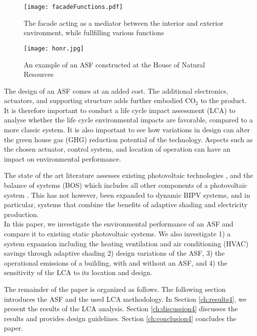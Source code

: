 \begin{figure}
\begin{center}
\texttt{[image: facadeFunctions.pdf]}
\caption{The facade acting as a mediator between the interior and exterior environment, while fullfilling various functions \cite{nagy2016adaptive}}
\label{fig:ASFschematic4}
\end{center}
\end{figure}

\begin{figure}
\begin{center}
\texttt{[image: honr.jpg]}
\caption{An example of an ASF constructed at the House of Natural Resources \cite{nagy2016adaptive}}
\label{fig:HoNR4}
\end{center}
\end{figure}

The design of an ASF comes at an added cost. The additional electronics, actuators, and supporting structure adds further embodied CO$_2$ to the product. It is therefore important to conduct a life cycle impact assessment (LCA) to analyse whether the life cycle environmental impacts are favorable, compared to a more classic system. It is also important to see how variations in design can alter the green house gas (GHG) reduction potential of the technology. Aspects such as the chosen actuator, control system, and location of operation can have an impact on environmental performance. 

The state of the art literature assesses existing photovoltaic technologies \cite{raugei2007life, de2013energy, fthenakis2011photovoltaics}, and the balance of systems (BOS) which includes all other components of a photovoltaic system \cite{mason2006energy}. This has not however, been expanded to dynamic BIPV systems, and in particular, systems that combine the benefits of adaptive shading and electricity production.\\


In this paper, we investigate the environmental performance of an ASF and compare it to existing static photovoltaic systems. We also investigate 1) a system expansion including the heating ventilation and air conditioning (HVAC) savings through adaptive shading 2) design variations of the ASF, 3) the operational emissions of a building, with and without an ASF, and 4) the sensitivity of the LCA to its location and design.



The remainder of the paper is organized as follows. The following section introduces the ASF and the used LCA methodology. In Section \ref{ch:results4}, we present the results of the LCA analysis. Section \ref{ch:discussion4} discusses the results and provides design guidelines. Section \ref{ch:conclusion4} concludes the paper.

